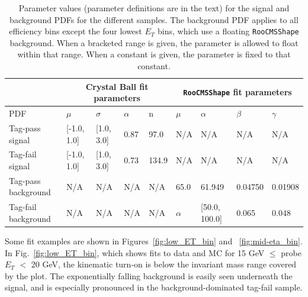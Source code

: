 \documentclass[dissertation.tex]{subfiles}
\begin{document}
\begin{table}[hcbp]
\caption{Parameter values (parameter definitions are in the text) for the signal and background PDFs for the different samples.  The background PDF applies to all efficiency bins except the four lowest $E_{T}$ bins, which use a floating \texttt{RooCMSShape} background.  When a bracketed range is given, the parameter is allowed to float within that range.  When a constant is given, the parameter is fixed to that constant.}
\centering
\begin{tabular}{|m{1.25cm}|m{1.25cm}|m{1.25cm}|m{1.25cm}|m{1.25cm}|m{1.25cm}|m{1.25cm}|m{1.25cm}|m{1.25cm}|}
\hline
& \multicolumn{4}{c|}{Crystal Ball fit parameters} & \multicolumn{4}{c|}{\texttt{RooCMSShape} fit parameters} \\
\hline
PDF & $\mu$ & $\sigma$ & $\alpha$ & n & $\mu$ & $\alpha$ & $\beta$ & $\gamma$ \\
\hline
Tag-pass signal & [-1.0, 1.0] & [1.0, 3.0] & 0.87 & 97.0 & N/A & N/A & N/A & N/A \\
\hline
Tag-fail signal & [-1.0, 1.0] & [1.0, 3.0] & 0.73 & 134.9 & N/A & N/A & N/A & N/A \\
\hline
Tag-pass background & N/A & N/A & N/A & N/A & 65.0 & 61.949 & 0.04750 & 0.01908 \\
\hline
Tag-fail background & N/A & N/A & N/A & N/A & $\alpha$ & [50.0, 100.0] & 0.065 & 0.048 \\
\hline
\end{tabular}
\label{tab:PDFs}
\end{table}

\marginpar{\textcolor{blue}{Added fits}}Some fit examples are shown in Figures~\ref{fig:low_ET_bin} and ~\ref{fig:mid-eta_bin}.  In Fig.~\ref{fig:low_ET_bin}, which shows fits to data and MC for 15 GeV $\leq$ probe $E_{T}$ $<$ 20 GeV, the kinematic turn-on is below the invariant mass range covered by the plot.  The exponentially falling background is easily seen underneath the signal, and is especially pronounced in the background-dominated tag-fail sample.
\end{document}
